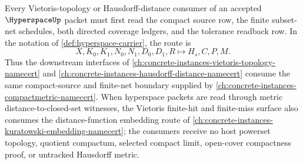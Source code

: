 \begin{theorem}
\label{thm:hyperspace-vietoris-handoff}
Every Vietoris-topology or Hausdorff-distance consumer of an accepted $\HyperspaceUp$ packet must first read the compact source row, the finite subset-net schedules, both directed coverage ledgers, and the tolerance readback row. In the notation of \autoref{def:hyperspace-carrier}, the route is
$$
X,K_0,K_1,N_0,N_1,D_0,D_1,R \longmapsto H_s,C,P,M .
$$
Thus the downstream interfaces of \autoref{ch:concrete-instances-vietoris-topology-namecert} and \autoref{ch:concrete-instances-hausdorff-distance-namecert} consume the same compact-source and finite-net boundary supplied by \autoref{ch:concrete-instances-compactmetric-namecert}. When hyperspace packets are read through metric distance-to-closed-set witnesses, the Vietoris finite-hit and finite-miss surface also consumes the distance-function embedding route of \autoref{ch:concrete-instances-kuratowski-embedding-namecert}; the consumers receive no host powerset topology, quotient compactum, selected compact limit, open-cover compactness proof, or untracked Hausdorff metric.
\end{theorem}
